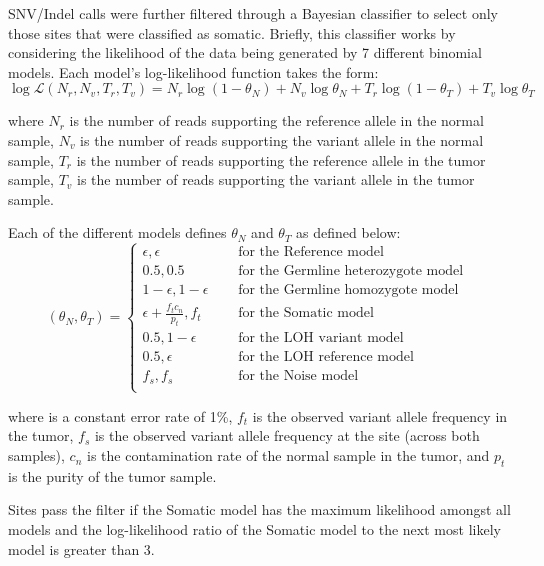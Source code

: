 \documentclass{article}
\begin{document}
SNV/Indel calls were further filtered through a Bayesian classifier to select only those sites that were classified as somatic. Briefly, this classifier works by considering the likelihood of the data being generated by 7 different binomial models. Each model's log-likelihood function takes the form:
\[ 

\log \mathcal{L} (N_r, N_v, T_r, T_v) = 
N_r \log (1 - \theta_N) + N_v \log \theta_N + T_r \log (1 - \theta_T) + T_v \log \theta_T

\]

where $N_r$ is the number of reads supporting the reference allele in the normal sample,
$N_v$ is the number of reads supporting the variant allele in the normal sample,
$T_r$ is the number of reads supporting the reference allele in the tumor sample,
$T_v$ is the number of reads supporting the variant allele in the tumor sample.

Each of the different models defines $\theta_N$ and $\theta_T$ as defined below:
\[

(\theta_N, \theta_T) = 
 \begin{cases}
   \epsilon, \epsilon & \quad \text{ for the Reference model }\\
   0.5, 0.5 & \quad \text{ for the Germline heterozygote model }\\
   1 - \epsilon, 1 - \epsilon & \quad \text{ for the Germline homozygote model }\\
   \epsilon + \frac{f_t c_n}{p_t}, f_t & \quad \text{ for the Somatic model }\\
   0.5, 1 - \epsilon & \quad \text{ for the LOH variant model }\\
   0.5, \epsilon & \quad \text{ for the LOH reference model }\\
   f_s, f_s & \quad \text{ for the Noise model }\\
 \end{cases}
\]

where \epsilon is a constant error rate of 1\%, 
$f_t$ is the observed variant allele frequency in the tumor,
$f_s$ is the observed variant allele frequency at the site (across both samples),
$c_n$ is the contamination rate of the normal sample in the tumor,
and $p_t$ is the purity of the tumor sample.

Sites pass the filter if the Somatic model has the maximum likelihood amongst all models and the log-likelihood ratio of the Somatic model to the next most likely model is greater than 3.
\end{document}
